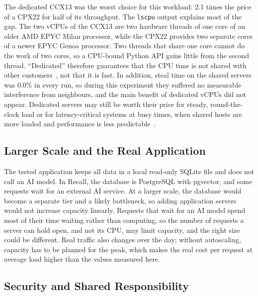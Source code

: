 \documentclass[conference,a4paper]{IEEEtran}
\begin{document}
The dedicated CCX13 was the worst choice for this workload: 2.1 times the price of a CPX22 for half of its throughput. The \texttt{lscpu} output explains most of the gap. The two vCPUs of the CCX13 are two hardware threads of one core of an older AMD EPYC Milan processor, while the CPX22 provides two separate cores of a newer EPYC Genoa processor. Two threads that share one core cannot do the work of two cores, so a CPU-bound Python API gains little from the second thread. ``Dedicated'' therefore guarantees that the CPU time is not shared with other customers~\cite{hz-ccx}, not that it is fast. In addition, steal time on the shared servers was 0.0\% in every run, so during this experiment they suffered no measurable interference from neighbours, and the main benefit of dedicated vCPUs did not appear. Dedicated servers may still be worth their price for steady, round-the-clock load or for latency-critical systems at busy times, when shared hosts are more loaded and performance is less predictable~\cite{leitner}.

\subsection{Larger Scale and the Real Application}

The tested application keeps all data in a local read-only SQLite file and does not call an AI model. In Recall, the database is PostgreSQL with pgvector, and some requests wait for an external AI service. At a larger scale, the database would become a separate tier and a likely bottleneck, so adding application servers would not increase capacity linearly. Requests that wait for an AI model spend most of their time waiting rather than computing, so the number of requests a server can hold open, and not its CPU, may limit capacity, and the right size could be different. Real traffic also changes over the day; without autoscaling, capacity has to be planned for the peak, which makes the real cost per request at average load higher than the values measured here.

\subsection{Security and Shared Responsibility}
\end{document}
